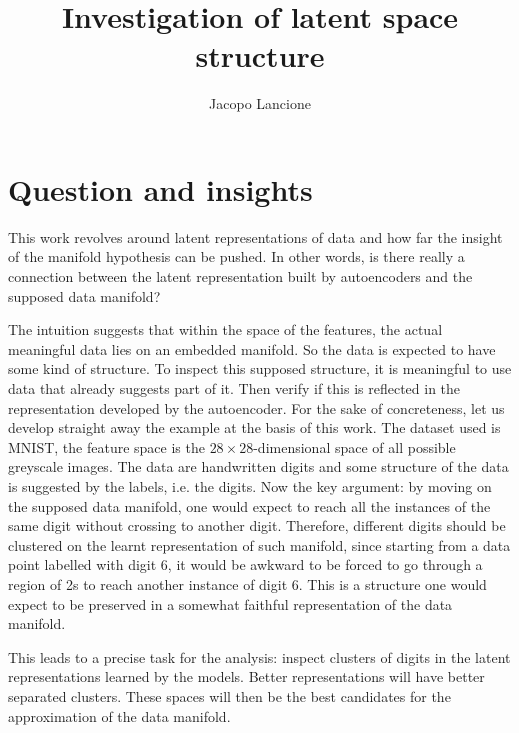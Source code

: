 \documentclass[twocolumn,gsifonts,twoside]{gsipaper}
\begin{document}
\title{\textbf{Investigation of latent space structure}}



\author{Jacopo Lancione}
\address{Università di Torino, jacopo.lancione@edu.unito.it}

\maketitle

\section{Question and insights}
This work revolves around latent representations of data and how far the insight of the manifold hypothesis can be pushed. In other words, is there really a connection between the latent representation built by autoencoders and the supposed data manifold?

The intuition suggests that within the space of the features, the actual meaningful data lies on an embedded manifold. So the data is expected to have some kind of structure. To inspect this supposed structure, it is meaningful to use data that already suggests part of it. Then verify if this is reflected in the representation developed by the autoencoder. For the sake of concreteness, let us develop straight away the example at the basis of this work. The dataset used is MNIST, the feature space is the $28\times28$-dimensional space of all possible greyscale images. The data are handwritten digits and some structure of the data is suggested by the labels, i.e. the digits. Now the key argument: by moving on the supposed data manifold, one would expect to reach all the instances of the same digit without crossing to another digit. Therefore, different digits should be clustered on the learnt representation of such manifold, since starting from a data point labelled with digit 6, it would be awkward to be forced to go through a region of 2s to reach another instance of digit 6. This is a structure one would expect to be preserved in a somewhat faithful representation of the data manifold.

This leads to a precise task for the analysis: inspect clusters of digits in the latent representations learned by the models. Better representations will have better separated clusters. These spaces will then be the best candidates for the approximation of the data manifold.
\end{document}
